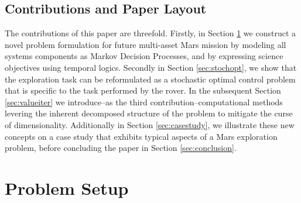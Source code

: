 \documentclass[conference]{IEEEtran}
\begin{document}
\subsection{Contributions and Paper Layout}

The contributions of this paper are threefold. Firstly, in Section \ref{sec:problem} we construct a novel problem formulation for future multi-asset Mars mission by modeling all systems components as Markov Decision Processes, and by expressing science objectives using temporal logics. Secondly in Section \ref{sec:stochopt}, we show that the exploration task can be reformulated as a stochastic optimal control problem that is specific to the task performed by the rover. In the subsequent Section \ref{sec:valueiter} we introduce--as the third contribution--computational methods levering the inherent decomposed structure of the problem to mitigate the curse of dimensionality. Additionally in Section \ref{sec:casestudy}, we illustrate these new concepts on a case study that exhibits typical aspects of a Mars exploration problem, before concluding the paper in Section \ref{sec:conclusion}.


\section{Problem Setup}
\label{sec:problem}
\end{document}
